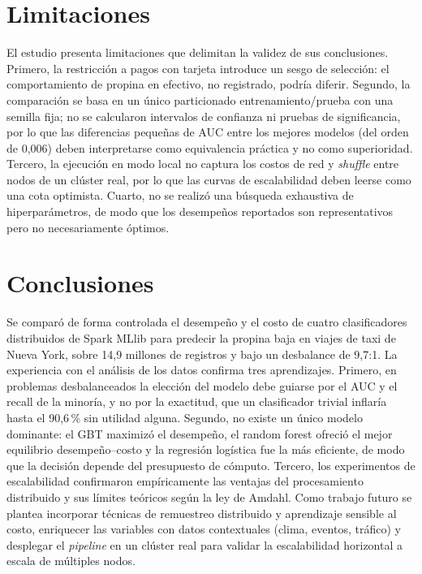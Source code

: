 \documentclass[conference]{IEEEtran}
\begin{document}
\section{Limitaciones}
El estudio presenta limitaciones que delimitan la validez de sus conclusiones.
Primero, la restricción a pagos con tarjeta introduce un sesgo de selección: el
comportamiento de propina en efectivo, no registrado, podría diferir. Segundo, la
comparación se basa en un único particionado entrenamiento/prueba con una semilla
fija; no se calcularon intervalos de confianza ni pruebas de significancia, por lo
que las diferencias pequeñas de AUC entre los mejores modelos (del orden de
0{,}006) deben interpretarse como equivalencia práctica y no como superioridad.
Tercero, la ejecución en modo local no captura los costos de red y \emph{shuffle}
entre nodos de un clúster real, por lo que las curvas de escalabilidad deben leerse
como una cota optimista. Cuarto, no se realizó una búsqueda exhaustiva de
hiperparámetros, de modo que los desempeños reportados son representativos pero no
necesariamente óptimos.

\section{Conclusiones}
Se comparó de forma controlada el desempeño y el costo de cuatro clasificadores
distribuidos de Spark MLlib para predecir la propina baja en viajes de taxi de
Nueva York, sobre 14{,}9 millones de registros y bajo un desbalance de 9{,}7:1. La
experiencia con el análisis de los datos confirma tres aprendizajes. Primero, en
problemas desbalanceados la elección del modelo debe guiarse por el AUC y el recall
de la minoría, y no por la exactitud, que un clasificador trivial inflaría hasta el
90{,}6\,\% sin utilidad alguna. Segundo, no existe un único
modelo dominante: el GBT maximizó el desempeño, el random forest ofreció el mejor
equilibrio desempeño--costo y la regresión logística fue la más eficiente, de modo
que la decisión depende del presupuesto de cómputo. Tercero, los experimentos de
escalabilidad confirmaron empíricamente las ventajas del procesamiento distribuido
y sus límites teóricos según la ley de Amdahl. Como trabajo futuro se plantea incorporar técnicas de remuestreo
distribuido y aprendizaje sensible al costo, enriquecer las variables con datos
contextuales (clima, eventos, tráfico) y desplegar el \emph{pipeline} en un clúster
real para validar la escalabilidad horizontal a escala de múltiples nodos.



\end{document}

